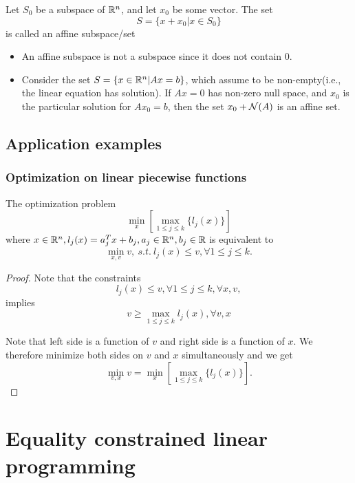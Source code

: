 \begin{refsection}
\begin{definition}
\cite[30]{bertsimas1997introduction}
Let $S_0$ be a subspace of $\mathbb{R}^n$, and let $x_0$ be some vector. The set
$$S = \{x+x_0|x\in S_0\}$$
is called an affine subspace/set
\end{definition}

\begin{remark}\hfill
\begin{itemize}
    \item An affine subspace is not a subspace since it does not contain $0$.
    \item Consider the set $S=\{x\in \mathbb{R}^n | Ax=b\}$, which assume to be non-empty(i.e., the linear equation has solution). If $Ax=0$ has non-zero null space, and $x_0$ is the particular solution for $Ax_0 = b$, then the set $x_0 + \mathcal{N}(A)$ is an affine set. 
\end{itemize}
\end{remark}


\subsection{Application examples}
\subsubsection{Optimization on linear piecewise functions}

\begin{lemma}
	The optimization problem
$$\min_{x}[\max_{1\leq j\leq k} \{l_j(x)\}]$$
where $x\in \mathbb{R}^n, l_j(x) = a^T_j x + b_j, a_j\in \mathbb{R}^n, b_j \in \mathbb{R}$
is equivalent to 
$$\min_{x,v} v, ~s.t.~ l_j(x) \leq v,  \forall 1\leq j\leq k.$$	
\end{lemma}
\begin{proof}
Note that the constraints	
$$l_j(x) \leq v,  \forall 1\leq j\leq k, \forall x, v,$$
implies
$$v \geq \max_{1\leq j\leq k} l_j(x), \forall v, x$$

Note that left side is a function of $v$ and right side is a function of $x$. We therefore minimize both sides on $v$ and $x$ simultaneously and we get
$$\min_{v,x} v = \min_{x}[\max_{1\leq j\leq k} \{l_j(x)\}]. $$

\end{proof}

\section{Equality constrained linear programming}


\end{refsection}
